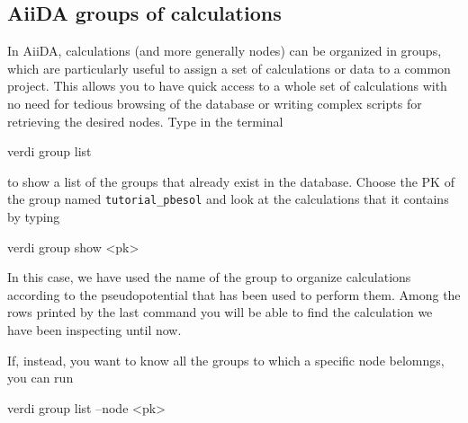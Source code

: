 \subsection{AiiDA groups of calculations}
In AiiDA, calculations (and more generally nodes) can be organized in groups, which are particularly useful to assign a set of calculations or data to a common project. This allows you to have quick access to a whole set of calculations with no need for tedious browsing of the database or writing complex scripts for retrieving the desired nodes. Type in the terminal
\begin{bashcommand}
verdi group list
\end{bashcommand}
to show a list of the groups that already exist in the database. Choose the PK of the group named \texttt{tutorial\_pbesol} and look at the calculations that it contains by typing
\begin{bashcommand}
verdi group show <pk>
\end{bashcommand}
In this case, we have used the name of the group to organize calculations according to the pseudopotential that has been used to perform them. Among the rows printed by the last command you will be able to find the calculation we have been inspecting until now. 

If, instead, you want to know all the groups to which a specific node belomngs, you can run 
\begin{bashcommand}
verdi group list --node <pk> 
\end{bashcommand}

